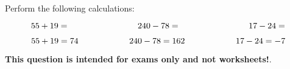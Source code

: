 

Perform the following calculations:

$$55 + 19 = \hbox{\hskip 80pt} 240 - 78 = \hbox{\hskip 80pt} 17 - 24 = $$







$$55 + 19 = 74 \hbox{\hskip 60pt} 240 - 78 = 162 \hbox{\hskip 60pt} 17 - 24 = -7$$







{\bf This question is intended for exams only and not worksheets!}.




